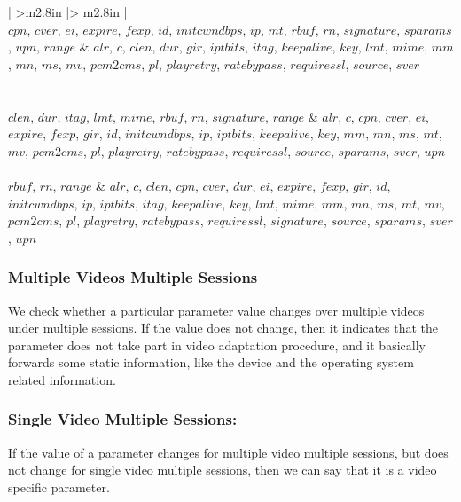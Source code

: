 \begin{table}[!t]
\begin{tabular}{ | >{\centering\arraybackslash}m{2.8in} |> {\centering\arraybackslash}m{2.8in} | }
		  \\ \hline
		$cpn$, $cver$, $ei$, $expire$, $fexp$, $id$, $initcwndbps$, $ip$, $mt$, $rbuf$, $rn$, $signature$, $sparams$, $upn$, $range$ &  $alr$, $c$, $clen$, $dur$, $gir$, $iptbits$, $itag$, $keepalive$, $key$, $lmt$, $mime$, $mm$, $mn$, $ms$, $mv$, $pcm2cms$, $pl$, $playretry$, $ratebypass$, $requiressl$, $source$, $sver$ \\ \hline
		    \\ \hline
		  \\ \hline
		$clen$, $dur$, $itag$, $lmt$, $mime$, $rbuf$, $rn$, $signature$, $range$ & $alr$, $c$, $cpn$, $cver$, $ei$, $expire$, $fexp$, $gir$, $id$, $initcwndbps$, $ip$, $iptbits$, $keepalive$, $key$, $mm$, $mn$, $ms$, $mt$, $mv$, $pcm2cms$, $pl$, $playretry$, $ratebypass$, $requiressl$, $source$, $sparams$, $sver$, $upn$ \\ \hline
		  \\ \hline
		$rbuf$, $rn$, $range$ & $alr$, $c$, $clen$, $cpn$, $cver$, $dur$, $ei$, $expire$, $fexp$, $gir$, $id$, $initcwndbps$, $ip$, $iptbits$, $itag$, $keepalive$, $key$, $lmt$, $mime$, $mm$, $mn$, $ms$, $mt$, $mv$, $pcm2cms$, $pl$, $playretry$, $ratebypass$, $requiressl$, $signature$, $source$, $sparams$, $sver$, $upn$ \\ \hline
	\end{tabular}
\end{table}
 
\subsubsection{Multiple Videos Multiple Sessions} We check whether a particular parameter value changes over multiple videos under multiple sessions. If the value does not change, then it indicates that the parameter does not take part in video adaptation procedure, and it basically forwards some static information, like the device and the operating system related information. 

\subsubsection{Single Video Multiple Sessions:} If the value of a parameter changes for multiple video multiple sessions, but does not change for single video multiple sessions, then we can say that it is a video specific parameter.

